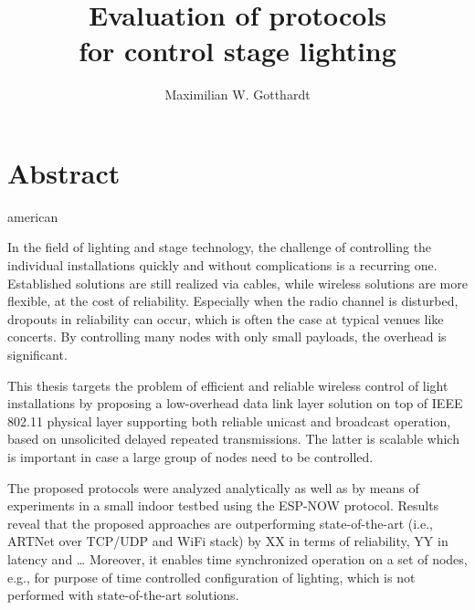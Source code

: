 \documentclass[]{ccs-thesis}
\author{Maximilian W. Gotthardt}
\title{Evaluation of protocols \\for control stage lighting}
\begin{document}

\maketitle

\thispagestyle{empty}

\cleardoublepage

\chapter*{Abstract}
\begin{otherlanguage*}{american}


In the field of lighting and stage technology, the challenge of controlling the individual installations 
quickly and without complications is a recurring one.
Established solutions are still realized via cables, 
while wireless solutions are more flexible, at the cost of reliability.
Especially when the radio channel is disturbed, dropouts in reliability can occur,
which is often the case at typical venues like concerts.
By controlling many nodes with only small payloads, the overhead is significant.

This thesis targets the problem of efficient and reliable wireless control of light installations 
by proposing a low-overhead data link layer solution on top of IEEE 802.11 physical layer
supporting both reliable unicast and broadcast operation,
based on unsolicited delayed repeated transmissions.
The latter is scalable which is important in case a large group of nodes need to be controlled.

The proposed protocols were analyzed analytically 
as well as by means of experiments in a small indoor testbed using the ESP-NOW protocol. 
Results reveal that the proposed approaches are outperforming state-of-the-art 
(i.e., ARTNet over TCP/UDP and WiFi stack) by XX in terms of reliability, YY in latency and … Moreover, 
it enables time synchronized operation on a set of nodes, e.g., 
for purpose of time controlled configuration of lighting, 
which is not performed with state-of-the-art solutions.


\end{otherlanguage*}
\end{document}

